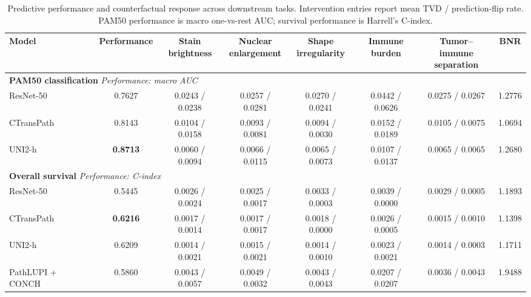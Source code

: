 \begin{table}[t]
\centering
\caption{Predictive performance and counterfactual response across downstream tasks. Intervention entries report mean TVD / prediction-flip rate. PAM50 performance is macro one-vs-rest AUC; survival performance is Harrell's C-index.}
\label{tab:xai_all_tasks}
\small
\renewcommand{\arraystretch}{1.30}
\setlength{\tabcolsep}{4.5pt}
\begin{adjustbox}{max width=\textwidth}
\begin{tabular}{lccccccc}
\toprule
\textbf{Model}
& \textbf{Performance}
& \shortstack{\textbf{Stain}\\\textbf{brightness}}
& \shortstack{\textbf{Nuclear}\\\textbf{enlargement}}
& \shortstack{\textbf{Shape}\\\textbf{irregularity}}
& \shortstack{\textbf{Immune}\\\textbf{burden}}
& \shortstack{\textbf{Tumor--immune}\\\textbf{separation}}
& \textbf{BNR} \\
\midrule

\multicolumn{8}{l}{
\textbf{PAM50 classification}
\hfill
\textit{Performance: macro AUC}
} \\
\midrule

ResNet-50
& 0.7627
& 0.0243 / 0.0238
& 0.0257 / 0.0281
& 0.0270 / 0.0241
& 0.0442 / 0.0626
& 0.0275 / 0.0267
& 1.2776 \\

CTransPath
& 0.8143
& 0.0104 / 0.0158
& 0.0093 / 0.0081
& 0.0094 / 0.0030
& 0.0152 / 0.0189
& 0.0105 / 0.0075
& 1.0694 \\

UNI2-h
& \textbf{0.8713}
& 0.0060 / 0.0094
& 0.0066 / 0.0115
& 0.0065 / 0.0073
& 0.0107 / 0.0137
& 0.0065 / 0.0065
& 1.2680 \\

\midrule
\multicolumn{8}{l}{
\textbf{Overall survival}
\hfill
\textit{Performance: C-index}
} \\
\midrule

ResNet-50
& 0.5445
& 0.0026 / 0.0024
& 0.0025 / 0.0017
& 0.0033 / 0.0003
& 0.0039 / 0.0000
& 0.0029 / 0.0005
& 1.1893 \\

CTransPath
& \textbf{0.6216}
& 0.0017 / 0.0014
& 0.0017 / 0.0017
& 0.0018 / 0.0000
& 0.0026 / 0.0005
& 0.0015 / 0.0010
& 1.1398 \\

UNI2-h
& 0.6209
& 0.0014 / 0.0021
& 0.0015 / 0.0021
& 0.0014 / 0.0010
& 0.0023 / 0.0021
& 0.0014 / 0.0003
& 1.1711 \\

PathLUPI + CONCH
& 0.5860
& 0.0043 / 0.0057
& 0.0049 / 0.0032
& 0.0043 / 0.0043
& 0.0207 / 0.0207
& 0.0036 / 0.0043
& 1.9488 \\

\bottomrule
\end{tabular}
\end{adjustbox}
\end{table}

